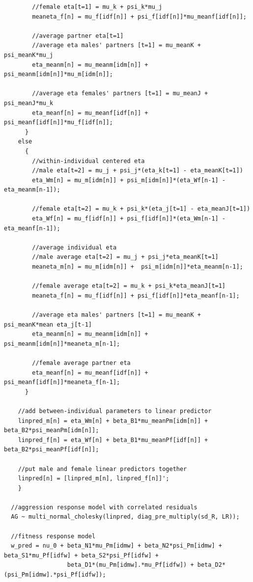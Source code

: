 \documentclass[
]{book}
\begin{document}
\begin{verbatim}
        //female eta[t=1] = mu_k + psi_k*mu_j
        meaneta_f[n] = mu_f[idf[n]] + psi_f[idf[n]]*mu_meanf[idf[n]];
        
        //average partner eta[t=1]
        //average eta males' partners [t=1] = mu_meanK + psi_meanK*mu_j
        eta_meanm[n] = mu_meanm[idm[n]] + psi_meanm[idm[n]]*mu_m[idm[n]];
        
        //average eta females' partners [t=1] = mu_meanJ + psi_meanJ*mu_k
        eta_meanf[n] = mu_meanf[idf[n]] + psi_meanf[idf[n]]*mu_f[idf[n]];
      }    
    else
      {
        //within-individual centered eta
        //male eta[t=2] = mu_j + psi_j*(eta_k[t=1] - eta_meanK[t=1])
        eta_Wm[n] = mu_m[idm[n]] + psi_m[idm[n]]*(eta_Wf[n-1] - eta_meanm[n-1]);
        
        //female eta[t=2] = mu_k + psi_k*(eta_j[t=1] - eta_meanJ[t=1])
        eta_Wf[n] = mu_f[idf[n]] + psi_f[idf[n]]*(eta_Wm[n-1] - eta_meanf[n-1]);
        
        //average individual eta
        //male average eta[t=2] = mu_j + psi_j*eta_meanK[t=1]
        meaneta_m[n] = mu_m[idm[n]] +  psi_m[idm[n]]*eta_meanm[n-1];
        
        //female average eta[t=2] = mu_k + psi_k*eta_meanJ[t=1]
        meaneta_f[n] = mu_f[idf[n]] + psi_f[idf[n]]*eta_meanf[n-1];
        
        //average eta males' partners [t=1] = mu_meanK + psi_meanK*mean eta_j[t-1]
        eta_meanm[n] = mu_meanm[idm[n]] + psi_meanm[idm[n]]*meaneta_m[n-1];
        
        //female average partner eta
        eta_meanf[n] = mu_meanf[idf[n]] + psi_meanf[idf[n]]*meaneta_f[n-1]; 
      }
    
    //add between-individual parameters to linear predictor
    linpred_m[n] = eta_Wm[n] + beta_B1*mu_meanPm[idm[n]] + beta_B2*psi_meanPm[idm[n]];
    linpred_f[n] = eta_Wf[n] + beta_B1*mu_meanPf[idf[n]] + beta_B2*psi_meanPf[idf[n]];
    
    //put male and female linear predictors together
    linpred[n] = [linpred_m[n], linpred_f[n]]';
    }
  
  //aggression response model with correlated residuals
  AG ~ multi_normal_cholesky(linpred, diag_pre_multiply(sd_R, LR));
    
  //fitness response model
  w_pred = nu_0 + beta_N1*mu_Pm[idmw] + beta_N2*psi_Pm[idmw] + beta_S1*mu_Pf[idfw] + beta_S2*psi_Pf[idfw] + 
                  beta_D1*(mu_Pm[idmw].*mu_Pf[idfw]) + beta_D2*(psi_Pm[idmw].*psi_Pf[idfw]);
  

\end{verbatim}
\end{document}
